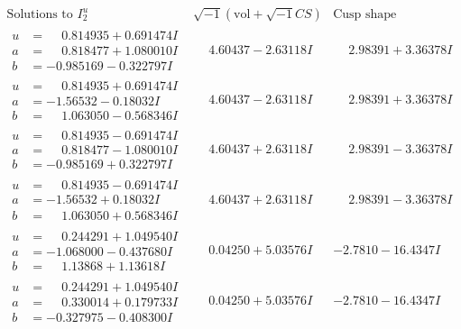 \documentclass[1p]{elsarticle_modified}
\theoremstyle{definition}
\newcommand{\I}{\sqrt{-1}}
\begin{document}
$$\begin{array}{c|c|c}  
\text{Solutions to }I^u_{2}& \I (\text{vol} + \sqrt{-1}CS) & \text{Cusp shape}\\
 \hline 
\begin{aligned}
u &= \phantom{-}0.814935 + 0.691474 I \\
a &= \phantom{-}0.818477 + 1.080010 I \\
b &= -0.985169 - 0.322797 I\end{aligned}
 & \phantom{-}4.60437 - 2.63118 I & \phantom{-}2.98391 + 3.36378 I \\ \hline\begin{aligned}
u &= \phantom{-}0.814935 + 0.691474 I \\
a &= -1.56532 - 0.18032 I \\
b &= \phantom{-}1.063050 - 0.568346 I\end{aligned}
 & \phantom{-}4.60437 - 2.63118 I & \phantom{-}2.98391 + 3.36378 I \\ \hline\begin{aligned}
u &= \phantom{-}0.814935 - 0.691474 I \\
a &= \phantom{-}0.818477 - 1.080010 I \\
b &= -0.985169 + 0.322797 I\end{aligned}
 & \phantom{-}4.60437 + 2.63118 I & \phantom{-}2.98391 - 3.36378 I \\ \hline\begin{aligned}
u &= \phantom{-}0.814935 - 0.691474 I \\
a &= -1.56532 + 0.18032 I \\
b &= \phantom{-}1.063050 + 0.568346 I\end{aligned}
 & \phantom{-}4.60437 + 2.63118 I & \phantom{-}2.98391 - 3.36378 I \\ \hline\begin{aligned}
u &= \phantom{-}0.244291 + 1.049540 I \\
a &= -1.068000 - 0.437680 I \\
b &= \phantom{-}1.13868 + 1.13618 I\end{aligned}
 & \phantom{-}0.04250 + 5.03576 I & -2.7810 - 16.4347 I \\ \hline\begin{aligned}
u &= \phantom{-}0.244291 + 1.049540 I \\
a &= \phantom{-}0.330014 + 0.179733 I \\
b &= -0.327975 - 0.408300 I\end{aligned}
 & \phantom{-}0.04250 + 5.03576 I & -2.7810 - 16.4347 I \\ \hline\begin{aligned}

\end{aligned}
\end{array}$$
\end{document}
